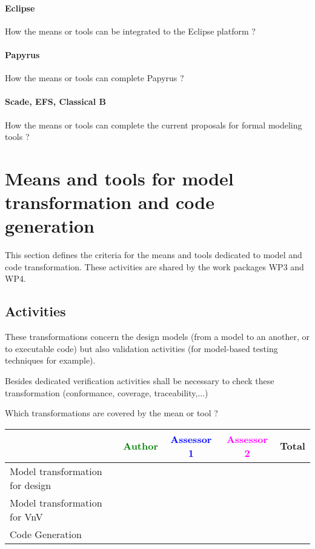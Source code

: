 \paragraph{Eclipse}
How the means or tools can be integrated to the Eclipse platform ?

\paragraph{Papyrus}
How the means or tools can complete  Papyrus ?


\paragraph{Scade, EFS, Classical B}
How the means or tools can complete the current proposals for formal modeling tools ?


\section{Means and tools for model transformation and code generation}
\label{sec:transformation}



This section defines the criteria for the means and tools dedicated to model and code transformation. These activities are shared by the work packages WP3 and WP4.


\subsection{Activities}

These transformations concern the design models  (from a model to an another, or to  executable code) but also validation activities (for model-based testing techniques for example).

Besides dedicated verification activities shall be necessary to  check these transformation (conformance, coverage, traceability,...)

Which transformations are covered by the mean or tool  ?

\begin{tabular}{|l | c | c | c | c|}
\hline
& \textcolor{green}{Author} & \textcolor{blue}{Assessor 1} & \textcolor{magenta}{Assessor 2} & Total \\
\hline 
Model transformation for design & & & &  \\
\hline
Model transformation for VnV  & & & & \\
\hline
Code Generation & & & & \\
\hline
\end{tabular}


